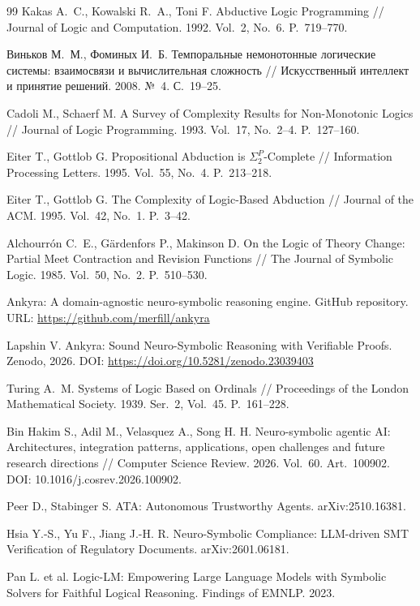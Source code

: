 \documentclass[12pt,a4paper]{article}
\begin{document}
\begin{thebibliography}{99}
	 Kakas A.~C., Kowalski R.~A., Toni F. Abductive Logic Programming // Journal of Logic and Computation. 1992. Vol.~2, No.~6. P.~719--770.

	 Виньков М.~М., Фоминых И.~Б. Темпоральные немонотонные логические системы: взаимосвязи и вычислительная сложность // Искусственный интеллект и принятие решений. 2008. №~4. С.~19--25.

	 Cadoli M., Schaerf M. A Survey of Complexity Results for Non-Monotonic Logics // Journal of Logic Programming. 1993. Vol.~17, No.~2--4. P.~127--160.

	 Eiter T., Gottlob G. Propositional Abduction is $\Sigma_2^P$-Complete // Information Processing Letters. 1995. Vol.~55, No.~4. P.~213--218.

	 Eiter T., Gottlob G. The Complexity of Logic-Based Abduction // Journal of the ACM. 1995. Vol.~42, No.~1. P.~3--42.

	 Alchourr\'on C.~E., G\"ardenfors P., Makinson D. On the Logic of Theory Change: Partial Meet Contraction and Revision Functions // The Journal of Symbolic Logic. 1985. Vol.~50, No.~2. P.~510--530.

	 Ankyra: A domain-agnostic neuro-symbolic reasoning engine. GitHub repository. URL: \url{https://github.com/merfill/ankyra}

	 Lapshin V. Ankyra: Sound Neuro-Symbolic Reasoning with Verifiable Proofs. Zenodo, 2026. DOI: \url{https://doi.org/10.5281/zenodo.23039403} 

	 Turing A.~M. Systems of Logic Based on Ordinals // Proceedings of the London Mathematical Society. 1939. Ser.~2, Vol.~45. P.~161--228.

	 Bin Hakim S., Adil M., Velasquez A., Song H. H. Neuro-symbolic agentic AI: Architectures, integration patterns, applications, open challenges and future research directions // Computer Science Review. 2026. Vol.~60. Art.~100902. DOI: 10.1016/j.cosrev.2026.100902.

	 Peer D., Stabinger S. ATA: Autonomous Trustworthy Agents. arXiv:2510.16381.

	 Hsia Y.-S., Yu F., Jiang J.-H. R. Neuro-Symbolic Compliance: LLM-driven SMT Verification of Regulatory Documents. arXiv:2601.06181.

	 Pan L. et al. Logic-LM: Empowering Large Language Models with Symbolic Solvers for Faithful Logical Reasoning. Findings of EMNLP. 2023.


\end{thebibliography}
\end{document}
